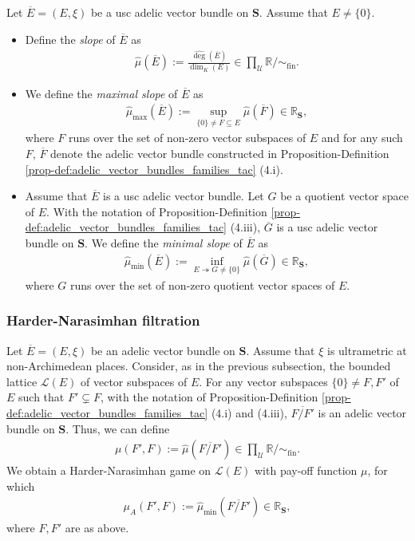\documentclass [11pt,reqno]{amsart}
\def\bR{{\mathbb{R}}}
\newcommand{\1}{\mathmybb{1}}
\def\cL{{\mathcal{L}}}
\def\cU{{\mathcal{U}}}
\def\fin{\mathrm{fin}}
\begin{document}
\begin{definition}
\label{def:slope_adelic_vector_bundles_family}
Let $\overline{E}=(E,\xi)$ be a usc adelic vector bundle on $\mathbf{S}$. Assume that $E\neq\{0\}$.
\begin{itemize}
	\item[(1)] Define the \emph{slope} of $\overline{E}$ as 
	\begin{align*}
	\widehat{\mu}(\overline{E}) := \frac{\widehat{\deg}(\overline{E})}{\dim_{K}(E)}\in \displaystyle\prod_{\cU}\bR/\sim_{\fin}.
	\end{align*}
	\item[(2)] We define the \emph{maximal slope} of $\overline{E}$ as
	\begin{align*}
	\widehat{\mu}_{\max}(\overline{E}) := \displaystyle \sup_{\{0\}\neq F \subseteq E} \widehat{\mu}(\overline{F})\in \bR_{\mathbf{S}},
	\end{align*}
	where $F$ runs over the set of non-zero vector subspaces of $E$ and for any such $F$, $\overline{F}$ denote the adelic vector bundle constructed in Proposition-Definition \ref{prop-def:adelic_vector_bundles_families_tac} (4.i).
	\item[(3)] Assume that $\overline{E}$ is a usc adelic vector bundle. Let $G$ be a quotient vector space of $E$. With the notation of Proposition-Definition \ref{prop-def:adelic_vector_bundles_families_tac} (4.iii), $\overline{G}$ is a usc adelic vector bundle on $\mathbf{S}$. We define the \emph{minimal slope} of $\overline{E}$ as 
	\begin{align*}
	\widehat{\mu}_{\min}(\overline{E}) := \displaystyle\inf_{E \twoheadrightarrow G \neq \{0\} } \widehat{\mu}(\overline{G})\in\bR_{\mathbf{S}},
	\end{align*}
	where $G$ runs over the set of non-zero quotient vector spaces of $E$.
\end{itemize}
\end{definition}

\subsubsection{Harder-Narasimhan filtration}

Let $\overline{E}=(E,\xi)$ be an adelic vector bundle on $\mathbf{S}$. Assume that $\xi$ is ultrametric at non-Archimedean places. Consider, as in the previous subsection, the bounded lattice $\cL(E)$ of vector subspaces of $E$. For any vector subspaces $\{0\}\neq F,F'$ of $E$ such that $F'\subsetneq F$, with the notation of Proposition-Definition \ref{prop-def:adelic_vector_bundles_families_tac} (4.i) and (4.iii), $\overline{F/F'}$ is an adelic vector bundle on $\mathbf{S}$. Thus, we can define
\begin{align*}
\mu(F',F) := \widehat{\mu}(\overline{F/F'}) \in \displaystyle\prod_{\cU}\bR/\sim_{\fin}. 
\end{align*}
We obtain a Harder-Narasimhan game on $\cL(E)$ with pay-off function $\mu$, for which
\begin{align*}
\mu_{A}(F',F) := \widehat{\mu}_{\min}(\overline{F/F'}) \in \bR_{\mathbf{S}},
\end{align*}
where $F,F'$ are as above. 
\end{document}
